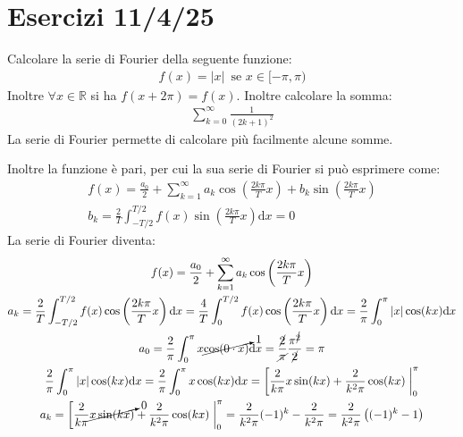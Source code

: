 \documentclass{article}
\newcommand{\df}{\mathrm{d}}
\numberwithin{equation}{subsection}
\begin{document}

\section{Esercizi 11/4/25}

Calcolare la serie di Fourier della seguente funzione:
\begin{gather*}
    f(x)=|x|\,\mbox{ se } x\in[-\pi,\pi)
\end{gather*}
Inoltre $\forall x\in\mathbb{R}$ si ha $f(x+2\pi)=f(x)$. Inoltre calcolare la somma:
\begin{gather*}
    \displaystyle\sum_{k=0}^\infty\frac{1}{(2k+1)^2}
\end{gather*}
La serie di Fourier permette di calcolare più facilmente alcune somme. %

Inoltre la funzione è pari, per cui la sua serie di Fourier si può esprimere come:
\begin{gather*}
    f(x)=\displaystyle\frac{a_0}{2}+\sum_{k=1}^\infty a_k\cos\left(\frac{2k\pi}{T}x\right)+b_k\sin\left(\frac{2k\pi}{T}x\right)\\
    b_k=\displaystyle\frac{2}{T}\int_{-T/2}^{T/2}f(x)\sin\left(\frac{2k\pi}{T}x\right)\df x=0
\end{gather*}
La serie di Fourier diventa:
\begin{gather*}
    f(x)=\displaystyle\frac{a_0}{2}+\sum_{k=1}^\infty a_k\cos\left(\frac{2k\pi}{T}x\right)\\
    a_k=\displaystyle\frac{2}{T}\int_{-T/2}^{T/2}f(x)\cos\left(\frac{2k\pi}{T}x\right)\df x=\displaystyle\frac{4}{T}\int_{0}^{T/2}f(x)\cos\left(\frac{2k\pi}{T}x\right)\df x=\frac{2}{\pi}\int_0^{\pi}|x|\cos(kx)\df x\\
    a_0=\displaystyle\frac{2}{\pi}\int_{0}^\pi x\cancelto{1}{\cos(0\cdot x)}\df x=\frac{\cancel{2}}{\cancel{\pi}}\frac{\pi^{\cancel{2}}}{\cancel{2}}=\pi\\
    \displaystyle\frac{2}{\pi}\int_0^{\pi}|x|\cos(kx)\df x=\frac{2}{\pi}\int_0^{\pi}x\cos(kx)\df x=\left[\frac{2}{k\pi}x\sin(kx)+\frac{2}{k^2\pi}\cos(kx)\right.\bigg|_0^\pi\\
    a_k=\left[\frac{2}{k\pi}\cancelto{0}{x\sin(kx)}+\frac{2}{k^2\pi}\cos(kx)\right.\bigg|_0^\pi=\frac{2}{k^2\pi}(-1)^k-\frac{2}{k^2\pi}=\frac{2}{k^2\pi}\left((-1)^{k}-1\right)
\end{gather*}
\end{document}

